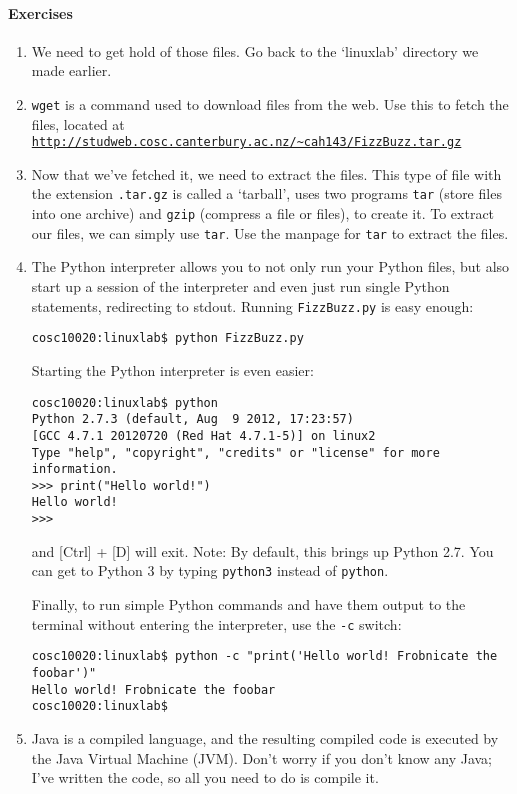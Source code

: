 \documentclass{article}
\begin{document}
\paragraph{Exercises}
\begin{enumerate}
\item We need to get hold of those files. Go back to the `linuxlab' directory we made earlier.
\item \texttt{wget} is a command used to download files from the web. Use this to fetch the files, located at \texttt{\url{http://studweb.cosc.canterbury.ac.nz/~cah143/FizzBuzz.tar.gz}}
\item Now that we've fetched it, we need to extract the files. This type of file with the extension \texttt{.tar.gz} is called a `tarball', uses two programs \texttt{tar} (store files into one archive) and \texttt{gzip} (compress a file or files), to create it. To extract our files, we can simply use \texttt{tar}. Use the manpage for \texttt{tar} to extract the files.

\item The Python interpreter allows you to not only run your Python files, but also start up a session of the interpreter and even just run single Python statements, redirecting to stdout.
Running \texttt{FizzBuzz.py} is easy enough:  
\begin{verbatim}
cosc10020:linuxlab$ python FizzBuzz.py
\end{verbatim}
Starting the Python interpreter is even easier:
\begin{verbatim}
cosc10020:linuxlab$ python
Python 2.7.3 (default, Aug  9 2012, 17:23:57) 
[GCC 4.7.1 20120720 (Red Hat 4.7.1-5)] on linux2
Type "help", "copyright", "credits" or "license" for more information.
>>> print("Hello world!")
Hello world!
>>>
\end{verbatim}
and [Ctrl] + [D] will exit.
Note: By default, this brings up Python 2.7. You can get to Python 3 by typing \texttt{python3} instead of \texttt{python}.

Finally, to run simple Python commands and have them output to the terminal without entering the interpreter, use the \texttt{-c} switch:
\begin{verbatim}
cosc10020:linuxlab$ python -c "print('Hello world! Frobnicate the foobar')"
Hello world! Frobnicate the foobar
cosc10020:linuxlab$ 
\end{verbatim}

\item Java is a compiled language, and the resulting compiled code is executed by the Java Virtual Machine (JVM). Don't worry if you don't know any Java; I've written the code, so all you need to do is compile it. 


\end{enumerate}
\end{document}
